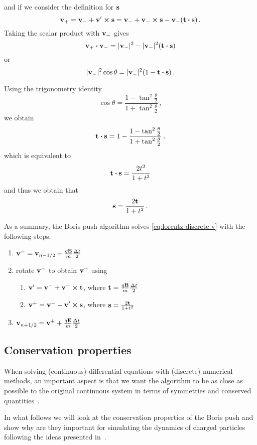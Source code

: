 \documentclass[12pt, class=report, crop=false]{standalone}
\begin{document}
and if we consider the definition for \(\vb{s}\)
\[
\vb{v}_+ = \vb{v}_- + \vb{v}' \cp \vb{s} =
\vb{v}_- + \vb{v}_- \cp \vb{s} - \vb{v}_- (\vb{t} \vdot \vb{s})\,.
\]
Taking the scalar product with \(\vb{v}_-\) gives
\[
\vb{v}_+ \vdot \vb{v}_- = |\vb{v}_-|^2 - |\vb{v}_-|^2 (\vb{t} \vdot \vb{s})
\]
or
\[
|\vb{v}_-|^2 \cos{\theta} = |\vb{v}_-|^2 (1 - \vb{t} \vdot \vb{s})\,.
\]

Using the trigonometry identity
\[
\cos{\theta} = \frac{1-\tan^2{\frac{\theta}{2}}}{1+\tan^2{\frac{\theta}{2}}}\,,
\]
we obtain
\[
\vb{t} \vdot \vb{s} = 1 - \frac{1-\tan^2{\frac{\theta}{2}}}{1+\tan^2{\frac{\theta}{2}}}\,,
\]
which is equivalent to
\[
\vb{t} \vdot \vb{s} = \frac{2 t^2}{1+t^2}
\]
and thus we obtain that
\[
\vb{s} = \frac{2 \vb{t}}{1+t^2}\,.
\]

As a summary, the Boris push algorithm solves \cref{eq:lorentz-discrete-v} with the following steps:
\begin{enumerate}
  \item \(\vb{v}^- = \vb{v}_{n-1/2} + \frac{q \vb{E}}{m} \frac{\Delta t}{2}\)
  \item rotate \(\vb{v}^-\) to obtain \(\vb{v}^+\) using
  \begin{enumerate}
    \item \(\vb{v}' = \vb{v}^- + \vb{v}^- \cp \vb{t}\), where \(\vb{t} = \frac{q \vb{B}}{m} \frac{\Delta t}{2}\)
    \item \(\vb{v}^+ = \vb{v}^- + \vb{v}' \cp \vb{s}\), where \(\vb{s} = \frac{2 \vb{t}}{1+t^2}\)
  \end{enumerate}
  \item \(\vb{v}_{n+1/2} = \vb{v}^+ + \frac{q \vb{E}}{m} \frac{\Delta t}{2}\)
\end{enumerate}

\subsection{Conservation properties}

When solving (continuous) differential equations with (discrete) numerical methods,
an important aspect is that we want the algorithm to be as close as possible to
the original continuous system in terms of symmetries and conserved
quantities~\autocite{stuart_dynamicalsystems_1996}.

In what follows we will look at the conservation properties of the Boris push
and show why are they important for simulating the dynamics of charged particles
following the ideas presented in~\textcite{qin_whyboris_2013}.
\end{document}
